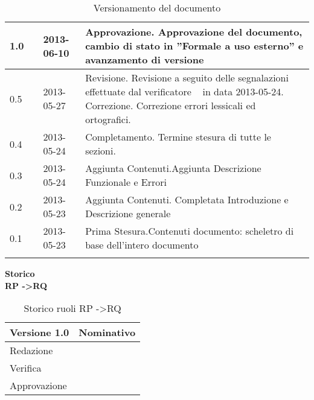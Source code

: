 \begin{longtable}{p{} p{} p{} p{}}
\midrule
1.0	&	\FZ &	2013-06-10 	&	Approvazione.\newline
						Approvazione del documento, cambio di stato in ”Formale a uso esterno” e avanzamento di versione\\
\midrule
0.5	&	\VP &	2013-05-27 	&	Revisione.\newline
						Revisione a seguito delle segnalazioni effettuate dal verificatore \EZ~ in data 2013-05-24.\newline
						Correzione.\newline
						Correzione errori lessicali ed ortografici.\\
\midrule
0.4	&	\VP &	2013-05-24 	&	Completamento.\newline
						Termine stesura di tutte le sezioni.\\
\midrule
0.3	&	\VP &	2013-05-24 	&	Aggiunta Contenuti.\newline Aggiunta Descrizione Funzionale e Errori\\
\midrule
0.2	&	\VP &	2013-05-23 	&	Aggiunta Contenuti.\newline
						Completata Introduzione e Descrizione generale\\
\midrule
0.1	&	\VP &	2013-05-23 	&	Prima Stesura.\newline Contenuti documento: scheletro di base dell'intero documento\\
\bottomrule

\caption{Versionamento del documento}
\end{longtable}

\newpage

\Large{\textbf{Storico }}\\
\normalsize
\textbf{RP -\textgreater RQ}

\begin{table}[h]
\begin{center}

\begin{tabular}{p{} p{}}
\toprule
\textbf{Versione 1.0}	&	\textbf{Nominativo}\\
\midrule
\midrule
Redazione	&	\VP \\
\midrule
Verifica &	\EZ	\\
\midrule
Approvazione	&	\FZ	\\
\bottomrule
\end{tabular}
\caption{Storico ruoli RP -\textgreater RQ}
\label{tabVers1}
\end{center}
\end{table}



